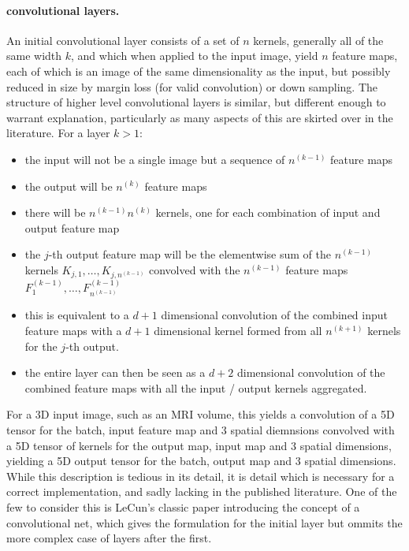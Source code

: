 \documentclass[msc]{infthesis}
\begin{document}
\paragraph*{convolutional layers.}
%
An initial convolutional layer consists of a set of \(n\) kernels, generally all of the same
width \(k\), and which when applied to the input image, yield \(n\) feature maps, each of which
is an image of the same dimensionality as the input, but possibly reduced in size by margin loss
(for valid convolution) or down sampling.  The structure of higher level convolutional layers is
similar, but different enough to warrant explanation, particularly as many aspects of this are
skirted over in the literature.  For a layer \(k > 1\):
%
\begin{itemize}
\item the input will not be a single image but a sequence of \(n^{(k-1)}\) feature maps
\item the output will be \(n^{(k)}\) feature maps 
\item there will be \(n^{(k-1)} n^{(k)}\) kernels, one for each combination of input and output
  feature map
\item the \(j\)-th output feature map will be the elementwise sum of the \(n^{(k-1)}\) kernels \(K_{j, 1},
  \ldots, K_{j, n^{(k-1)}}\) convolved with the \(n^{(k-1)}\) feature maps \(F_{1}^{(k-1)}, \ldots,
  F_{n^{(k-1)}}^{(k-1)}\)
\item this is equivalent to a \(d+1\) dimensional convolution of the combined input feature maps
  with a \(d+1\) dimensional kernel formed from all \(n^{(k+1)}\) kernels for the \(j\)-th output.
\item the entire layer can then be seen as a \(d+2\) dimensional convolution of the combined
  feature maps with all the input / output kernels aggregated.
\end{itemize}
For a 3D input image, such as an MRI volume, this yields a convolution of a 5D tensor for the
batch, input feature map and 3 spatial diemnsions convolved with a 5D tensor of kernels for the
output map, input map and 3 spatial dimensions, yielding a 5D output tensor for the batch, output
map and 3 spatial dimensions.  While this description is tedious in its detail, it is detail which
is necessary for a correct implementation, and sadly lacking in the published literature.  One of
the few to consider this is LeCun's classic paper introducing the concept of a convolutional net,
which gives the formulation for the initial layer but ommits the more complex case of layers after
the first.\cite{lecun1990handwritten}
\end{document}
